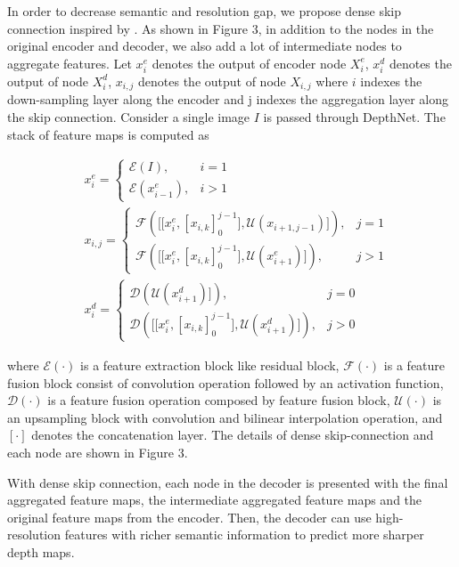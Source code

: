 \documentclass[letterpaper]{article} \usepackage{aaai21}  \usepackage{times}  \usepackage{helvet} \usepackage{courier}  \usepackage[hyphens]{url}  \usepackage{graphicx} \urlstyle{rm} \def\UrlFont{\rm}  \usepackage{natbib}  \usepackage{caption} \frenchspacing  \setlength{\pdfpagewidth}{8.5in}  \setlength{\pdfpageheight}{11in}  \usepackage{booktabs}
\begin{document}
In order to decrease semantic and resolution gap, we propose dense skip connection inspired by \cite{zhou2018unet++}. As shown in Figure 3, in addition to the nodes in the original encoder and decoder,
we also add a lot of intermediate nodes to aggregate features. Let $x^{e}_i$ denotes the output of encoder node $X^{e}_i$, $x^{d}_i$ denotes the output of node $X^{d}_i$,
$x_{i,j}$ denotes the output of node $X_{i,j}$ where $i$ indexes the down-sampling layer along the encoder and j indexes the aggregation layer along the skip connection. Consider a single image $I$ is
passed through DepthNet. The stack of feature maps is computed as

\begin{align}
    &x^{e}_i = \left\{
    \begin{array}{ll}
        \mathcal{E}(I),&i = 1 \\
        \mathcal{E}(x^{e}_{i-1}),&i > 1 
    \end{array}
    \right.\\
    &x_{i,j}=\left\{
    \begin{array}{ll}
        \mathcal{F}(\Big[\big[x^{e}_{i}, [x_{i,k}]^{j-1}_0\big],\mathcal{U}(x_{i+1,j-1})\Big]),&j = 1 \\
        \mathcal{F}(\Big[\big[x^{e}_{i}, [x_{i,k}]^{j-1}_0\big],\mathcal{U}(x^{e}_{i+1})\Big]),&j > 1
    \end{array}
    \right. \\
    &x^{d}_{i}=\left\{
    \begin{array}{ll}
        \mathcal{D}(\mathcal{U}(x^d_{i+1})]),&j = 0  \\
        \mathcal{D}(\Big[\big[x^{e}_{i}, [x_{i,k}]^{j-1}_0\big],\mathcal{U}(x^d_{i+1})\Big]),&j > 0 
    \end{array}
    \right.
\end{align}

where $\mathcal{E}(\cdot)$ is a feature extraction block like residual block, $\mathcal{F}(\cdot)$ is a feature fusion block consist of convolution operation followed by an activation function, $\mathcal{D}(\cdot{})$ is a feature
fusion operation composed by feature fusion block, $\mathcal{U}(\cdot)$ is an upsampling block with convolution and bilinear interpolation operation, and $[\cdot]$ denotes
the concatenation layer. The details of dense skip-connection and each node are shown in Figure 3.

With dense skip connection, each node in the decoder is presented with the final aggregated feature maps, the intermediate aggregated feature maps and the original
feature maps from the encoder. Then, the decoder can use high-resolution features with richer semantic information to predict more sharper depth maps.
\end{document}
